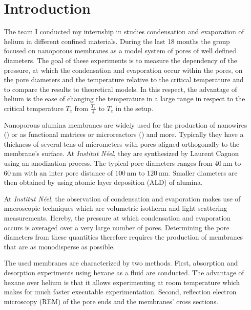 \documentclass[../thesis.tex]{subfiles}
\begin{document}
  \chapter{Introduction}
  \label{ch:introduction}

    The team I conducted my internship in studies condensation and evaporation of helium in different confined materials. During the last 18 months the group focused on nanoporous membranes as a model system of pores of well defined diameters. The goal of these experiments is to measure the dependency of the pressure, at which the condensation and evaporation occur within the pores, on the pore diameters and the temperature relative to the critical temperature and to compare the results to theoretical models. In this respect, the advantage of helium is the ease of changing the temperature in a large range in respect to the critical temperature $T_\mathrm{c}$ from $\frac{T_\mathrm{c}}{4}$ to $T_\mathrm{c}$ in the setup.
    \medskip

    Nanoporous alumina membranes are widely used for the production of nanowires (\cite{nanowires}) or as functional matrices or microreactors (\cite{al-mem-matrices}) and more. Typically they have a thickness of several tens of micrometers with pores aligned orthogonally to the membrane's surface. At \textit{Institut Néel}, they are synthesized by Laurent Cagnon using an anodization process. The typical pore diameters ranges from $\SI{40}{\nano\meter}$ to $\SI{60}{\nano\meter}$ with an inter pore distance of $\SI{100}{\nano\meter}$ to $\SI{120}{\nano\meter}$. Smaller diameters are then obtained by using atomic layer deposition (ALD) of alumina.
    \medskip

    At \textit{Institut Néel}, the observation of condensation and evaporation makes use of macroscopic techniques which are volumetric isotherm and light scattering measurements. Hereby, the pressure at which condensation and evaporation occurs is averaged over a very large number of pores. Determining the pore diameters from these quantities therefore requires the production of membranes that are as monodisperse as possible.
    \medskip

    The used membranes are characterized by two methods. First, absorption and desorption experiments using hexane as a fluid are conducted. The advantage of hexane over helium is that it allows experimenting at room temperature which makes for much faster executable experimentation. Second, reflection electron microscopy (REM) of the pore ends and the membranes' cross sections.
    \medskip
\end{document}
